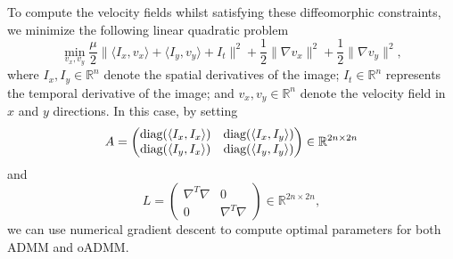 \documentclass[letterpaper]{article} %
\begin{document}
To compute the velocity fields whilst satisfying these diffeomorphic constraints, we minimize the following linear quadratic problem \cite{thorley2021nesterov}
\begin{equation} \label{eq:OF}
\min_{v_x, v_y} \frac{\mu}{2} \| \langle  I_x, {v_x} \rangle + \langle I_y, {v_y} \rangle + I_t   \|^2 + \frac{1}{2} \|\nabla v_x\|^2 + \frac{1}{2}  \|\nabla v_y\|^2,
\end{equation}
where $I_x, I_y\in \mathbb{R}^{n}$ denote the spatial derivatives of the image; $I_t\in \mathbb{R}^{n}$ represents the temporal derivative of the image; and $v_x, v_y \in \mathbb{R}^{n}$ denote the velocity field in $x$ and $y$ directions. In this case, by setting
$$A=\begin{pmatrix}
\textup{diag}(\langle I_x, I_x \rangle ) & \textup{diag}(\langle I_x, I_y \rangle )\\
\textup{diag}(\langle I_y, I_x \rangle ) & \textup{diag}(\langle I_y, I_y \rangle )
\end{pmatrix} \in \mathbb{R}^{2n\times2n} $$
and
$$L=\begin{pmatrix}
\nabla ^T\nabla  & 0\\
0 & \nabla ^T\nabla
\end{pmatrix}\in \mathbb{R}^{2n\times2n},$$
we can use numerical gradient descent to compute optimal parameters for both ADMM and oADMM.
\end{document}
